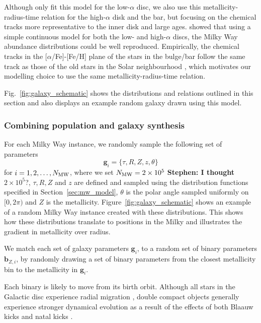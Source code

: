 Although \citet{Frankel+2018} only fit this model for the low-$\alpha$ disc, we also use this metallicity-radius-time relation for the high-$\alpha$ disk and the bar, but focusing on the chemical tracks more representative to the inner disk and large ages. \citet{Sharma+2020} showed that using a simple continuous model for both the low- and high-$\alpha$ discs, the Milky Way abundance distributions could be well reproduced. Empirically, the chemical tracks in the [$\alpha$/Fe]-[Fe/H] plane of the stars in the bulge/bar follow the same track as those of the old stars in the Solar neighbourhood \citep[][Fig.~7,]{Bovy+2019}, which motivates our modelling choice to use the same metallicity-radius-time relation.

Fig.~\ref{fig:galaxy_schematic} shows the distributions and relations outlined in this section and also displays an example random galaxy drawn using this model.

\subsubsection{Combining population and galaxy synthesis}\label{sec:combining_pop_gal}

For each Milky Way instance, we randomly sample the following set of parameters
\begin{equation}
    \mathbf{g}_{{i}} = \{\tau, R, Z, z, \theta\}
\end{equation}
for $i = 1, 2, \dots, N_{\rm MW}$, where we set $N_{\rm MW} = 2 \times 10^{5}$ {\color{blue} \textbf{Stephen: I thought $2 \times 10^{5}$}?}, $\tau, R, Z$ and $z$ are defined and sampled using the distribution functions specified in Section~\ref{sec:mw_model}, $\theta$ is the polar angle sampled uniformly on $[0, 2\pi)$ and $Z$ is the metallicity. Figure~\ref{fig:galaxy_schematic} shows an example of a random Milky Way instance created with these distributions. This shows how these distributions translate to positions in the Milky and illustrates the gradient in metallicity over radius.

We match each set of galaxy parameters $\mathbf{g}_{{i}}$, to a random set of binary parameters $\mathbf{b}_{{Z, i}}$, by randomly drawing a set of binary parameters from the closest metallicity bin to the metallicity in $\mathbf{g}_{{i}}$.

Each binary is likely to move from its birth orbit. Although all stars in the Galactic disc experience radial migration \citep{Sellwood+2002, Frankel+2018}, double compact objects generally experience stronger dynamical evolution as a result of the effects of both Blaauw kicks \citep{Blaauw+1961} and natal kicks \citep[e.g.][]{Hobbs+2005}.


